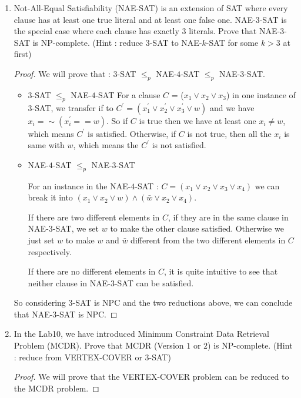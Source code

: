 \documentclass[12pt,a4paper]{article}
\theoremstyle{definition}
\begin{document}
\begin{enumerate}
	\item Not-All-Equal Satisfiability (NAE-SAT) is an extension of SAT where every clause has at least one true literal and at least one false one. NAE-$3$-SAT is the special case where each clause has exactly $3$ literals. Prove that NAE-$3$-SAT is NP-complete. (Hint : reduce $3$-SAT to NAE-$k$-SAT for some $k > 3$ at first)
	\begin{proof}
   
	 We will prove that : $3$-SAT $\leq_{p}$ NAE-$4$-SAT $\leq_{p}$ NAE-$3$-SAT.
	 
	 \begin{itemize}
		 \item $3$-SAT $\leq_{p}$ NAE-$4$-SAT
		  For a clause $C$ = ($x_1 \lor  x_2 \lor x_3$) in one instance of $3$-SAT, we transfer if to $C^{'}=(x^{'}_1 \lor  x^{'}_2 \lor  x^{'}_3 \lor w)$ and we have 
		  $x_i = \sim (x^{'}_i == w)$. So if  $C$ is true then we have at least one $x_i \neq w$, which means $C^{'}$ is satisfied. Otherwise, if $C$ is not true, then all the 
		  $x_i$ is same with $w$, which means the $C^{'}$ is not satisfied.

		 \item NAE-$4$-SAT $\leq_{p}$ NAE-$3$-SAT
		 
		 For an instance in the NAE-$4$-SAT : $C = (x_1 \lor  x_2 \lor x_3 \lor x_4)$ we can break it into $(x_1 \lor x_2 \lor w) \land (\bar{w} \lor x_2 \lor x_4)$.

		 If there are two different elements in $C$, if they are in the same clause in NAE-$3$-SAT, we set $w$ to make the other clause satisfied. Otherwise we just set $w$ to make $w$ and $\bar{w}$ different from 
	 the two different elements in $C$ respectively.

	 If there are no different elements in $C$, it is quite intuitive to see that neither clause in NAE-$3$-SAT can be satisfied.
		\end{itemize}

		So considering $3$-SAT is NPC and the two reductions above, we can conclude that NAE-$3$-SAT is NPC.


    \end{proof}

	\item In the Lab10, we have introduced Minimum Constraint Data Retrieval Problem (MCDR). Prove that MCDR (Version $1$ or $2$) is NP-complete. (Hint : reduce from VERTEX-COVER or $3$-SAT)
	
	\begin{proof}
    We will prove that the VERTEX-COVER problem can be reduced to the MCDR problem.
	 

\end{proof}
\end{enumerate}
\end{document}
